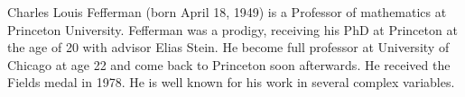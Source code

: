 \documentclass[12pt]{article}
\theoremstyle{theorem}
\theoremstyle{definition}
\theoremstyle{remark}
\begin{document}
Charles Louis Fefferman (born April 18, 1949) is a Professor of mathematics at Princeton University.  Fefferman was a  prodigy, receiving his PhD at Princeton at the age of 20 with advisor Elias Stein.  He become full professor at University of Chicago at age 22 and come back to Princeton soon afterwards.  He received the Fields medal in 1978.  He is well known for his work in several complex variables.
\end{document}
